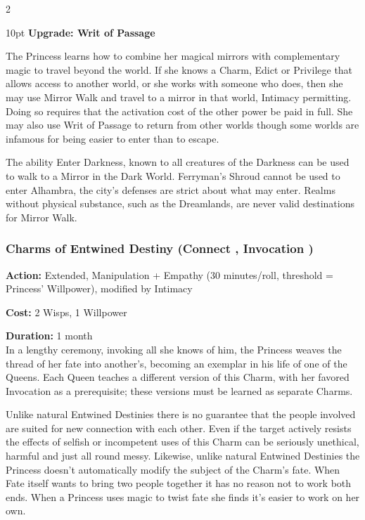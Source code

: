 \begin{multicols}{2}
\begin{myindentpar}{10pt}
\textbf{Upgrade: Writ of Passage}

The Princess learns how to combine her magical mirrors with complementary magic to travel beyond the world. If she knows a Charm, Edict or Privilege that allows access to another world, or she works with someone who does, then she may use Mirror Walk and travel to a mirror in that world, Intimacy permitting. Doing so requires that the activation cost of the other power be paid in full. She may also use Writ of Passage to return from other worlds \textendash though some worlds are infamous for being easier to enter than to escape. 

The ability Enter Darkness, known to all creatures of the Darkness can be used to walk to a Mirror in the Dark World. Ferryman's Shroud cannot be used to enter Alhambra, the city's defenses are strict about what may enter. Realms without physical substance, such as the Dreamlands, are never valid destinations for Mirror Walk.

\end{myindentpar}

\subsubsection*{Charms of Entwined Destiny (Connect \textbullet\textbullet\textbullet\textbullet, Invocation \textbullet\textbullet\textbullet)}

\noindent \textbf{Action:} Extended, Manipulation + Empathy (30 minutes/roll, threshold = Princess' Willpower), modified by Intimacy

\noindent \textbf{Cost:} 2 Wisps, 1 Willpower

\noindent \textbf{Duration:} 1 month \\

\noindent In a lengthy ceremony, invoking all she knows of him, the Princess weaves the thread of her fate into another's, becoming an exemplar in his life of one of the Queens. Each Queen teaches a different version of this Charm, with her favored Invocation as a prerequisite; these versions must be learned as separate Charms.

Unlike natural Entwined Destinies there is no guarantee that the people involved are suited for new connection with each other. Even if the target actively resists the effects of selfish or incompetent uses of this Charm can be seriously unethical, harmful and just all round messy. Likewise, unlike natural Entwined Destinies the Princess doesn't automatically modify the subject of the Charm's fate. When Fate itself wants to bring two people together it has no reason not to work both ends. When a Princess uses magic to twist fate she finds it's easier to work on her own.


\end{multicols}
